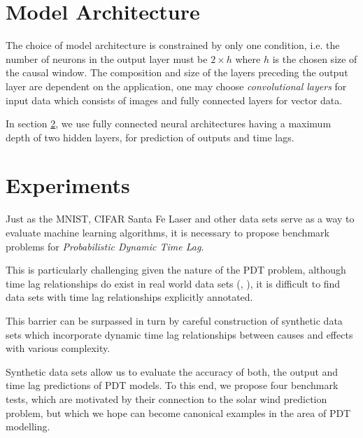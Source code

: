 \documentclass[envcountsect,runningheads]{llncs}
\theoremstyle{etoile}
\begin{document}
\section{Model Architecture}

The choice of model architecture is constrained by only one condition, i.e. the number of neurons 
in the output layer must be $2 \times h$ where $h$ is the chosen size of the causal window. 
The composition and size of the layers preceding the output layer are dependent on the application, 
one may choose \emph{convolutional layers} for input data which consists of images and fully connected 
layers for vector data.



In section \ref{sec:exp}, we use fully connected neural architectures having a maximum depth of 
two hidden layers, for prediction of outputs and time lags.

\section{Experiments}\label{sec:exp}


Just as the MNIST, CIFAR Santa Fe Laser and other data sets serve as a way to evaluate machine learning 
algorithms, it is necessary to propose benchmark problems for \emph{Probabilistic Dynamic Time Lag}.

This is particularly challenging given the nature of the PDT problem, although time lag 
relationships do exist in real world data sets (\cite{doi:10.1002/jgra.50429}, \cite{ZHOU2006195}), 
it is difficult to find data sets with time lag relationships explicitly annotated.

This barrier can be surpassed in turn by careful construction of synthetic data sets which incorporate 
dynamic time lag relationships between causes and effects with various complexity.

Synthetic data sets allow us to evaluate the accuracy of both, the output and time lag predictions of 
PDT models. To this end, we propose four benchmark tests, which are motivated by their connection 
to the solar wind prediction problem, but which we hope can become canonical examples in the area 
of PDT modelling.
\end{document}
